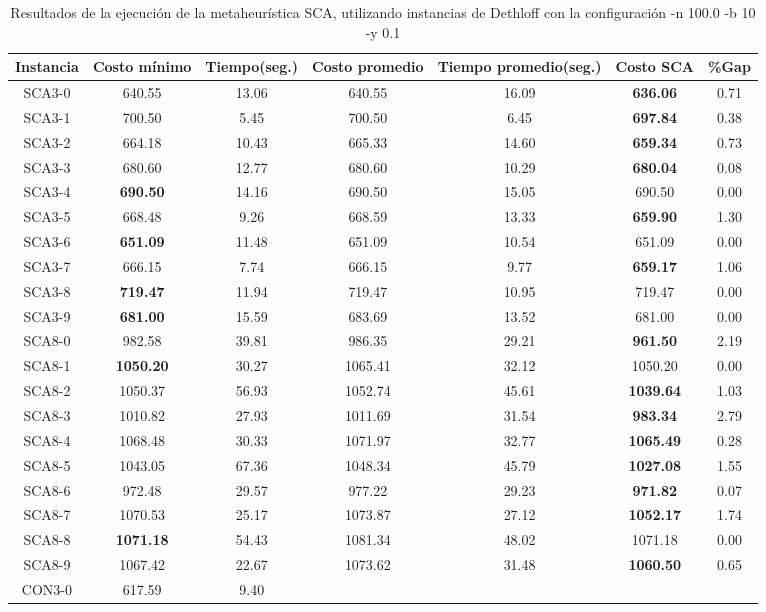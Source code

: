 \begin{table}[ht]
\caption{Resultados de la ejecución de la metaheurística SCA, utilizando instancias de Dethloff con la configuración -n 100.0 -b 10 -y 0.1}
\centering
\small
\begin{tabular}{c c c c c c c}
\hline\hline
Instancia & Costo mínimo & Tiempo(seg.) & Costo promedio & Tiempo promedio(seg.) & Costo SCA & \%Gap \\ [0.5ex]
\hline
SCA3-0 & 640.55 & 13.06 & 
640.55 & 16.09 & \bf{636.06} & 
0.71\\SCA3-1 & 700.50 & 5.45 & 
700.50 & 6.45 & \bf{697.84} & 
0.38\\SCA3-2 & 664.18 & 10.43 & 
665.33 & 14.60 & \bf{659.34} & 
0.73\\SCA3-3 & 680.60 & 12.77 & 
680.60 & 10.29 & \bf{680.04} & 
0.08\\SCA3-4 & \bf{690.50} & 14.16 & 
690.50 & 15.05 & 690.50 & 0.00\\
SCA3-5 & 668.48 & 9.26 & 
668.59 & 13.33 & \bf{659.90} & 
1.30\\SCA3-6 & \bf{651.09} & 11.48 & 
651.09 & 10.54 & 651.09 & 0.00\\
SCA3-7 & 666.15 & 7.74 & 
666.15 & 9.77 & \bf{659.17} & 
1.06\\SCA3-8 & \bf{719.47} & 11.94 & 
719.47 & 10.95 & 719.47 & 0.00\\
SCA3-9 & \bf{681.00} & 15.59 & 
683.69 & 13.52 & 681.00 & 0.00\\
SCA8-0 & 982.58 & 39.81 & 
986.35 & 29.21 & \bf{961.50} & 
2.19\\SCA8-1 & \bf{1050.20} & 30.27 & 
1065.41 & 32.12 & 1050.20 & 0.00\\
SCA8-2 & 1050.37 & 56.93 & 
1052.74 & 45.61 & \bf{1039.64} & 
1.03\\SCA8-3 & 1010.82 & 27.93 & 
1011.69 & 31.54 & \bf{983.34} & 
2.79\\SCA8-4 & 1068.48 & 30.33 & 
1071.97 & 32.77 & \bf{1065.49} & 
0.28\\SCA8-5 & 1043.05 & 67.36 & 
1048.34 & 45.79 & \bf{1027.08} & 
1.55\\SCA8-6 & 972.48 & 29.57 & 
977.22 & 29.23 & \bf{971.82} & 
0.07\\SCA8-7 & 1070.53 & 25.17 & 
1073.87 & 27.12 & \bf{1052.17} & 
1.74\\SCA8-8 & \bf{1071.18} & 54.43 & 
1081.34 & 48.02 & 1071.18 & 0.00\\
SCA8-9 & 1067.42 & 22.67 & 
1073.62 & 31.48 & \bf{1060.50} & 
0.65\\CON3-0 & 617.59 & 9.40 & 

\end{tabular}
\end{table}

